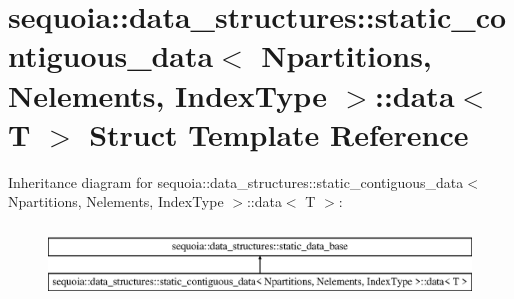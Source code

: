 \hypertarget{structsequoia_1_1data__structures_1_1static__contiguous__data_1_1data}{}\section{sequoia\+::data\+\_\+structures\+::static\+\_\+contiguous\+\_\+data$<$ Npartitions, Nelements, Index\+Type $>$\+::data$<$ T $>$ Struct Template Reference}
\label{structsequoia_1_1data__structures_1_1static__contiguous__data_1_1data}
Inheritance diagram for sequoia\+::data\+\_\+structures\+::static\+\_\+contiguous\+\_\+data$<$ Npartitions, Nelements, Index\+Type $>$\+::data$<$ T $>$\+:\begin{figure}[H]
\begin{center}
\leavevmode
\includegraphics[height=1.968366cm]{structsequoia_1_1data__structures_1_1static__contiguous__data_1_1data}
\end{center}
\end{figure}
